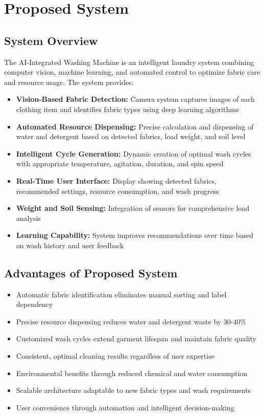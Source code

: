 \section{Proposed System}

\subsection{System Overview}
The AI-Integrated Washing Machine is an intelligent laundry system combining computer vision, machine learning, and automated control to optimize fabric care and resource usage. The system provides:

\begin{itemize}
    \item \textbf{Vision-Based Fabric Detection:} Camera system captures images of each clothing item and identifies fabric types using deep learning algorithms
    \item \textbf{Automated Resource Dispensing:} Precise calculation and dispensing of water and detergent based on detected fabrics, load weight, and soil level
    \item \textbf{Intelligent Cycle Generation:} Dynamic creation of optimal wash cycles with appropriate temperature, agitation, duration, and spin speed
    \item \textbf{Real-Time User Interface:} Display showing detected fabrics, recommended settings, resource consumption, and wash progress
    \item \textbf{Weight and Soil Sensing:} Integration of sensors for comprehensive load analysis
    \item \textbf{Learning Capability:} System improves recommendations over time based on wash history and user feedback
\end{itemize}

\subsection{Advantages of Proposed System}
\begin{itemize}
    \item Automatic fabric identification eliminates manual sorting and label dependency
    \item Precise resource dispensing reduces water and detergent waste by 30-40\%
    \item Customized wash cycles extend garment lifespan and maintain fabric quality
    \item Consistent, optimal cleaning results regardless of user expertise
    \item Environmental benefits through reduced chemical and water consumption
    \item Scalable architecture adaptable to new fabric types and wash requirements
    \item User convenience through automation and intelligent decision-making
\end{itemize}

